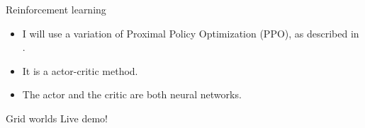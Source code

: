 \documentclass[10pt]{beamer}
\begin{document}
\begin{frame}{Reinforcement learning}
  \begin{itemize}[<+- | alert@+>]
    \item I will use a variation of Proximal Policy Optimization (PPO), as described in \citet{schulman2017proximal}.
    \item It is a actor-critic method. 
    \item The actor and the critic are both neural networks.
  \end{itemize}
  
\end{frame}

\begin{frame}{Grid worlds}
  \centering
  \Huge{Live demo!}
\end{frame}
\end{document}
